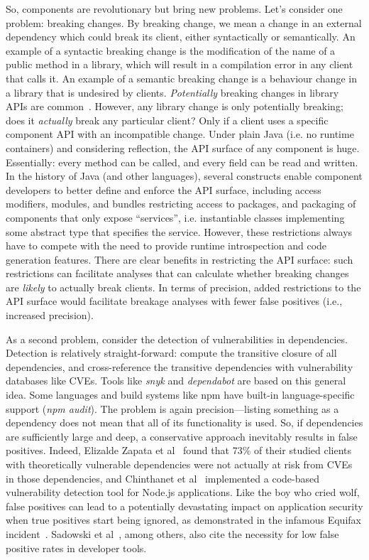 So, components are revolutionary but bring new problems. Let's consider one problem: breaking changes. By breaking change, we mean a change in an external dependency which could break its client, either syntactically or semantically. An example of a syntactic breaking change is the modification of the name of a public method in a library, which will result in a compilation error in any client that calls it. An example of a semantic breaking change is a behaviour change in a library that is undesired by clients. \textit{Potentially} breaking changes in library APIs are common~\cite{dietrich2014broken,raemaekers2014semantic}. However, any library change is only potentially breaking; does it \textit{actually} break any particular client? Only if a client uses a specific component API with an incompatible change. Under plain Java (i.e. no runtime containers) and considering reflection, the API surface of any component is huge. Essentially: every method can be called, and every field can be read and written. In the history of Java (and other languages), several constructs enable component developers to better define and enforce the API surface, including access modifiers, modules, and bundles restricting access to packages, and packaging of components that only expose ``services'', i.e. instantiable classes implementing some abstract type that specifies the service. However, these restrictions always have to compete with the need to provide runtime introspection and code generation features. There are clear benefits in restricting the API surface: such restrictions can facilitate analyses that can calculate whether breaking changes are \textit{likely} to actually break clients.  In terms of precision, added restrictions to the API surface would facilitate breakage analyses with fewer false positives (i.e., increased precision). 

As a second problem, consider the detection of vulnerabilities in dependencies. Detection is relatively straight-forward: compute the transitive closure of all dependencies, and cross-reference the transitive dependencies with vulnerability databases like CVEs. Tools like \textit{snyk} and \textit{dependabot} are based on this general idea. Some languages and build systems like npm have built-in language-specific support (\textit{npm audit}). The problem is again precision---listing something as a dependency does not mean that all of its functionality is used. So, if dependencies are sufficiently large and deep, a conservative approach inevitably results in false positives. Indeed, Elizalde Zapata et al~\cite{elizalde18:_towar_smoot_librar_migrat} found that 73\% of their studied clients with theoretically vulnerable dependencies were not actually at risk from CVEs in those dependencies, and Chinthanet et al~\cite{chinthanet20:_code_based_vulner_detec_node} implemented a code-based vulnerability detection tool for Node.js applications. Like the boy who cried wolf, false positives can lead to a potentially devastating impact on application security when true positives start being ignored, as demonstrated in the infamous Equifax incident~\cite{luszcz2018apache}. Sadowski et al~\cite{sadowski2018lessons}, among others, also cite the necessity for low false positive rates in developer tools.

